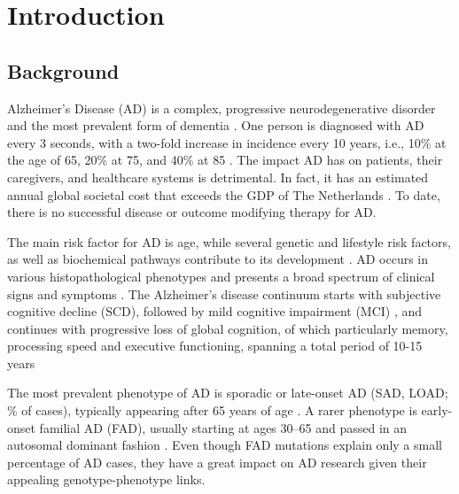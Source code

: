 \documentclass{amsart}
\theoremstyle{plain}
\newcommand{\mainmatter}{
    \newpage
    \pagenumbering{arabic}  %
}
\begin{document}
\mainmatter

\section{Introduction}\label{Intro}
\subsection{Background}
Alzheimer’s Disease (AD) is a complex, progressive neurodegenerative disorder and the most prevalent form of dementia \cite{Penke2023NewDisease}. One person is diagnosed with AD every 3 seconds, with a two-fold increase in incidence every 10 years, i.e., 10\% at the age of 65, 20\% at 75, and 40\% at 85 \cite{MartinPrince2015WorldTrends}. The impact AD has on patients, their caregivers, and healthcare systems is detrimental. In fact, it has an estimated annual global societal cost that exceeds the GDP of The Netherlands \cite{Wimo2023The2019}. To date, there is no successful disease or outcome modifying therapy for AD.

The main risk factor for AD is age, while several genetic and lifestyle risk factors, as well as biochemical pathways contribute to its development \cite{Penke2023NewDisease}. AD occurs in various histopathological phenotypes and presents a broad spectrum of clinical signs and symptoms \cite{Heneka2015NeuroinflammationDisease, Edwards2019ANeurodegeneration}. The Alzheimer's disease continuum starts with subjective cognitive decline (SCD), followed by mild cognitive impairment (MCI) \cite{Rasmussen2019AlzheimersDiagnosis}, and continues with progressive loss of global cognition, of which particularly memory, processing speed and executive functioning, spanning a total period of 10-15 years \cite{Scheltens2016AlzheimersDisease} 

The most prevalent phenotype of AD is sporadic or late-onset AD (SAD, LOAD; \% of cases), typically appearing after 65 years of age \cite{Beydoun2014EpidemiologicMeta-analysis}. A rarer phenotype is early-onset familial AD (FAD), usually starting at ages 30–65 and passed in an autosomal dominant fashion \cite{VanCauwenberghe2015ThePerspectives}.
Even though FAD mutations explain only a small percentage of AD cases, they have a great impact on AD research given their appealing genotype-phenotype links.
\end{document}
